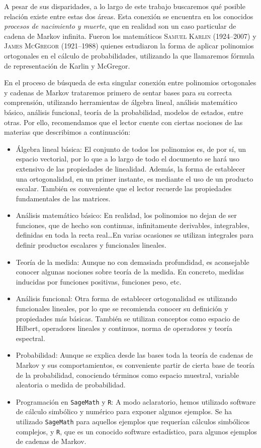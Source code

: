 A pesar de sus disparidades, a lo largo de este trabajo buscaremos qué posible relación existe entre estas dos áreas. Esta conexión se encuentra en los conocidos \textit{procesos de nacimiento y muerte}, que en realidad son un caso particular de cadena de Markov infinita. Fueron los matemáticos \textsc{Samuel Karlin} (1924--2007) y \textsc{James McGregor} (1921--1988) quienes estudiaron la forma de aplicar polinomios ortogonales en el cálculo de probabilidades, utilizando la que llamaremos fórmula de representación de Karlin y McGregor.

En el proceso de búsqueda de esta singular conexión entre polinomios ortogonales y cadenas de Markov trataremos primero de sentar bases para su correcta comprensión, utilizando herramientas de álgebra lineal, análisis matemático básico, análisis funcional, teoría de la probabilidad, modelos de estados, entre otras. Por ello, recomendamos que el lector cuente con ciertas nociones de las materias que describimos a continuación:
\begin{itemize}
    \item Álgebra lineal básica: El conjunto de todos los polinomios es, de por sí, un espacio vectorial, por lo que a lo largo de todo el documento se hará uso extensivo de las propiedades de linealidad. Además, la forma de establecer una ortogonalidad, en un primer instante, es mediante el uso de un producto escalar. También es conveniente que el lector recuerde las propiedades fundamentales de las matrices.
    \item Análisis matemático básico: En realidad, los polinomios no dejan de ser funciones, que de hecho son continuas, infinitamente derivables, integrables, definidas en toda la recta real\dots En varias ocasiones se utilizan integrales para definir productos escalares y funcionales lineales.
    \item Teoría de la medida: Aunque no con demasiada profundidad, es aconsejable conocer algunas nociones sobre teoría de la medida. En concreto, medidas inducidas por funciones positivas, funciones peso, etc.
    \item Análisis funcional: Otra forma de establecer ortogonalidad es utilizando funcionales lineales, por lo que se recomienda conocer su definición y propiedades más básicas. También se utilizan conceptos como espacio de Hilbert, operadores lineales y continuos, norma de operadores y teoría espectral.
    \item Probabilidad: Aunque se explica desde las bases toda la teoría de cadenas de Markov y sus comportamientos, es conveniente partir de cierta base de teoría de la probabilidad, conociendo términos como espacio muestral, variable aleatoria o medida de probabilidad.
    \item Programación en \texttt{SageMath} y \texttt{R}: A modo aclaratorio, hemos utilizado software de cálculo simbólico y numérico para exponer algunos ejemplos. Se ha utilizado \texttt{SageMath} para aquellos ejemplos que requerían cálculos simbólicos complejos, y \texttt{R}, que es un conocido software estadístico, para algunos ejemplos de cadenas de Markov.
\end{itemize}

